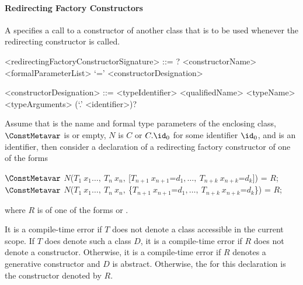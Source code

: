 \documentclass[makeidx]{article}
\begin{document}


\paragraph{Redirecting Factory Constructors}

\LMHash{}%
A 
specifies a call to a constructor of another class that is to be used
whenever the redirecting constructor is called.

\begin{grammar}
<redirectingFactoryConstructorSignature> ::= \gnewline{}
  \CONST? \FACTORY{} <constructorName> <formalParameterList> `=' \gnewline{}
  <constructorDesignation>

<constructorDesignation> ::= <typeIdentifier>
  \alt <qualifiedName>
  \alt <typeName> <typeArguments> (`.' <identifier>)?
\end{grammar}

Assume that
%
is the name and formal type parameters of the enclosing class,
%
$\ConstMetavar$ is \CONST{} or empty,
$N$ is $C$ or $C.\id_0$ for some identifier $\id_0$,
and \DefineSymbol{\id} is an identifier,
then consider a declaration of a redirecting factory constructor
 of one of the forms

\begin{normativeDartCode}
$\ConstMetavar$ \FACTORY{}
    $N$($T_1\ x_1 \ldots,\ T_n\ x_n,\ $[$T_{n+1}\ x_{n+1}$=$d_1, \ldots,\ T_{n+k}\ x_{n+k}$=$d_k$]) = $R$;
\\
$\ConstMetavar$ \FACTORY{}
    $N$($T_1\ x_1 \ldots,\ T_n\ x_n,\ $\{$T_{n+1}\ x_{n+1}$=$d_1, \ldots,\ T_{n+k}\ x_{n+k}$=$d_k$\}) = $R$;
\end{normativeDartCode}

\noindent
{}%
where $R$ is of one of the forms
 or
.

\LMHash{}%
It is a compile-time error if $T$ does not denote
a class accessible in the current scope.
If $T$ does denote such a class $D$,
it is a compile-time error if $R$ does not denote a constructor.
Otherwise, it is a compile-time error
if $R$ denotes a generative constructor and $D$ is abstract.
Otherwise, the
for this declaration is the constructor  denoted by $R$.
\end{document}
